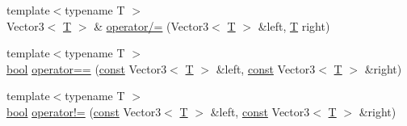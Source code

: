 \begin{DoxyCompactItemize}
\item 
{\footnotesize template$<$typename T $>$ }\\Vector3$<$ \hyperlink{curses_8priv_8h_a5ef253115820acf7d27f3c5c3b02a0f0}{T} $>$ \& \hyperlink{lapin_2dep_2_s_f_m_l-2_83_2include_2_s_f_m_l_2_system_2_vector3_8inl_a3c594d037661835b73f36aa05ad91936}{operator/=} (Vector3$<$ \hyperlink{curses_8priv_8h_a5ef253115820acf7d27f3c5c3b02a0f0}{T} $>$ \&left, \hyperlink{curses_8priv_8h_a5ef253115820acf7d27f3c5c3b02a0f0}{T} right)
\item 
{\footnotesize template$<$typename T $>$ }\\\hyperlink{term__entry_8h_a002004ba5d663f149f6c38064926abac}{bool} \hyperlink{lapin_2dep_2_s_f_m_l-2_83_2include_2_s_f_m_l_2_system_2_vector3_8inl_a388d72db973306a35ba467016b3dee30}{operator==} (\hyperlink{term__entry_8h_a57bd63ce7f9a353488880e3de6692d5a}{const} Vector3$<$ \hyperlink{curses_8priv_8h_a5ef253115820acf7d27f3c5c3b02a0f0}{T} $>$ \&left, \hyperlink{term__entry_8h_a57bd63ce7f9a353488880e3de6692d5a}{const} Vector3$<$ \hyperlink{curses_8priv_8h_a5ef253115820acf7d27f3c5c3b02a0f0}{T} $>$ \&right)
\item 
{\footnotesize template$<$typename T $>$ }\\\hyperlink{term__entry_8h_a002004ba5d663f149f6c38064926abac}{bool} \hyperlink{lapin_2dep_2_s_f_m_l-2_83_2include_2_s_f_m_l_2_system_2_vector3_8inl_a608500d1ad3b78082cb5bb4356742bd4}{operator!=} (\hyperlink{term__entry_8h_a57bd63ce7f9a353488880e3de6692d5a}{const} Vector3$<$ \hyperlink{curses_8priv_8h_a5ef253115820acf7d27f3c5c3b02a0f0}{T} $>$ \&left, \hyperlink{term__entry_8h_a57bd63ce7f9a353488880e3de6692d5a}{const} Vector3$<$ \hyperlink{curses_8priv_8h_a5ef253115820acf7d27f3c5c3b02a0f0}{T} $>$ \&right)
\end{DoxyCompactItemize}


